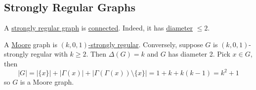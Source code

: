 \documentclass{article}
\begin{document}
\subsection{Strongly Regular Graphs}
\begin{remark}
    A \hyperlink{def:sr}{strongly regular graph} is \hyperlink{def:components}{connected}. Indeed, it has \hyperlink{def:diameter}{diameter} $\leq 2$.
\end{remark}
A \hyperlink{def:moore}{Moore} graph is \hyperlink{def:sr}{$(k,0,1)$-strongly regular}.
Conversely, suppose $G$ is $(k,0,1)$-strongly regular with $k \geq 2$. Then $\Delta(G) = k$ and $G$ has diameter 2.
Pick $x \in G$, then
\begin{equation*}
    |G| = |\{x\}| + |\Gamma(x)| + |\Gamma(\Gamma(x)) \setminus \{x\}| = 1 + k + k(k-1) = k^2 + 1
\end{equation*}
so $G$ is a Moore graph.
\end{document}
